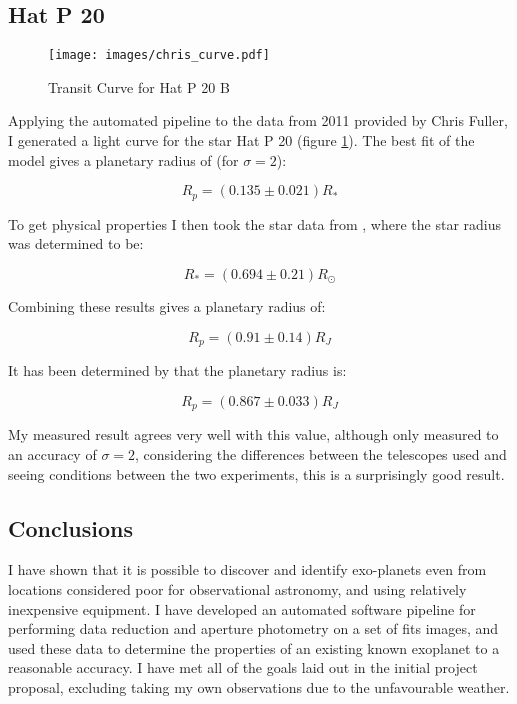 \subsection{Hat P 20}

\begin{figure}[ht]
    \centering
    \texttt{[image: images/chris\_curve.pdf]}
    \caption{Transit Curve for Hat P 20 B}
    \label{fig:hatp20_curve}
\end{figure}

Applying the automated pipeline to the data from 2011 provided by Chris Fuller, I generated a light curve for the star Hat P 20 (figure \ref{fig:hatp20_curve}). The best fit of the \citep{mandel2002analytic} model gives a planetary radius of (for $\sigma=2$):

\[ R_p = (0.135 \pm 0.021) R_* \]

To get physical properties I then took the star data from \citep{bakos2011hat}, where the star radius was determined to be:

\[ R_* = (0.694\pm0.21) R_\odot \]

Combining these results gives a planetary radius of:

\[ R_p = (0.91\pm0.14) R_J \]

It has been determined by \citep{bakos2011hat} that the planetary radius is:

\[ R_p = (0.867\pm0.033) R_J \]

My measured result agrees very well with this value, although only measured to an accuracy of $\sigma=2$, considering the differences between the telescopes used and seeing conditions between the two experiments, this is a surprisingly good result.

\subsection{Conclusions}

I have shown that it is possible to discover and identify exo-planets even from locations considered poor for observational astronomy, and using relatively inexpensive equipment. I have developed an automated software pipeline for performing data reduction and aperture photometry on a set of fits images, and used these data to determine the properties of an existing known exoplanet to a reasonable accuracy.
I have met all of the goals laid out in the initial project proposal, excluding taking my own observations due to the unfavourable weather.
